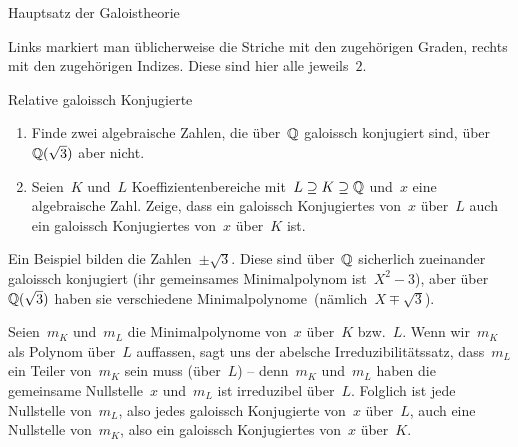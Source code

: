 \documentclass{algblatt}
\begin{document}
\begin{aufgabe}{Hauptsatz der Galoistheorie}
\begin{loesung}
\begin{center}
\end{center}
Links markiert man üblicherweise die Striche mit den zugehörigen Graden, rechts
mit den zugehörigen Indizes. Diese sind hier alle jeweils~$2$.
\end{loesung}
\end{aufgabe}

\begin{aufgabe}{Relative galoissch Konjugierte}
\begin{enumerate}
\item Finde zwei algebraische Zahlen, die über~$\mathbb{Q}$ galoissch konjugiert sind,
über~$\mathbb{Q}(\sqrt{3})$ aber nicht.
\item Seien~$K$ und~$L$ Koeffizientenbereiche mit~$L \supseteq K \supseteq
\mathbb{Q}$ und~$x$ eine algebraische Zahl. Zeige, dass ein galoissch Konjugiertes
von~$x$ über~$L$ auch ein galoissch Konjugiertes von~$x$ über~$K$ ist.
\end{enumerate}

\begin{loesungE}
\item Ein Beispiel bilden die Zahlen~$\pm\sqrt{3}$. Diese sind über~$\mathbb{Q}$
sicherlich zueinander galoissch konjugiert (ihr gemeinsames Minimalpolynom
ist~$X^2 - 3$), aber über~$\mathbb{Q}(\sqrt{3})$ haben sie verschiedene
Minimalpolynome~(nämlich~$X \mp \sqrt{3}$).

\item Seien~$m_K$ und~$m_L$ die Minimalpolynome von~$x$ über~$K$ bzw.~$L$. Wenn
wir~$m_K$ als Polynom über~$L$ auffassen, sagt uns der abelsche
Irreduzibilitätssatz, dass~$m_L$ ein Teiler von~$m_K$ sein muss (über~$L$) --
denn~$m_K$ und~$m_L$ haben die gemeinsame Nullstelle~$x$ und~$m_L$ ist
irreduzibel über~$L$. Folglich ist jede Nullstelle von~$m_L$, also jedes
galoissch Konjugierte von~$x$ über~$L$, auch eine Nullstelle von~$m_K$, also
ein galoissch Konjugiertes von~$x$ über~$K$.
\end{loesungE}
\end{aufgabe}
\end{document}
